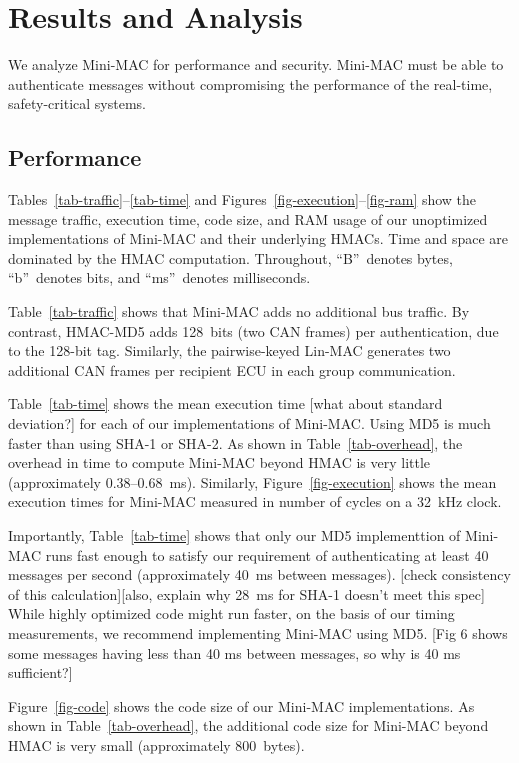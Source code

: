 \section{Results and Analysis}
\label{analysis}

We analyze Mini-MAC for performance and security. 
Mini-MAC must be able to authenticate messages 
without compromising the performance of the real-time, safety-critical systems.

\subsection{Performance}
\label{performance}

Tables~\ref{tab-traffic}--\ref{tab-time} and Figures~\ref{fig-execution}--\ref{fig-ram}
show the message traffic, execution time, code size, and RAM usage of our unoptimized implementations
of Mini-MAC and their underlying HMACs.  Time and space are dominated by the HMAC computation.
Throughout, ``B''~denotes bytes, ``b''~denotes bits, and ``ms''~denotes milliseconds.

Table~\ref{tab-traffic} shows that Mini-MAC adds no additional bus traffic.
By contrast, HMAC-MD5 adds 128~bits (two CAN frames) per authentication,
due to the 128-bit tag.  Similarly, the pairwise-keyed Lin-MAC generates
two additional CAN frames per recipient ECU in each group communication.

Table~\ref{tab-time} shows the mean execution time
[what about standard deviation?] for each of our implementations of Mini-MAC.
Using MD5 is much faster than using SHA-1 or SHA-2.  As shown in Table~\ref{tab-overhead},
the overhead in time to compute Mini-MAC beyond HMAC is very little (approximately 0.38--0.68~ms).
Similarly, Figure~\ref{fig-execution} shows the mean execution times for Mini-MAC measured
in number of cycles on a 32~kHz clock.

Importantly, Table~\ref{tab-time} shows that only our MD5 implementtion of Mini-MAC runs fast enough to satisfy our
requirement of authenticating at least 40 messages per second (approximately
40~ms between messages).   
[check consistency of this calculation][also, explain why 28~ms for SHA-1 doesn't meet
this spec]
While highly optimized code might run faster, on the
basis of our timing measurements, we recommend implementing Mini-MAC using MD5.
[Fig 6 shows some messages having less than 40 ms between messages, so why is 40 ms sufficient?]

Figure~\ref{fig-code} shows the code size of our Mini-MAC implementations.
As shown in Table~\ref{tab-overhead}, the additional code size for Mini-MAC beyond
HMAC is very small (approximately 800~bytes).

